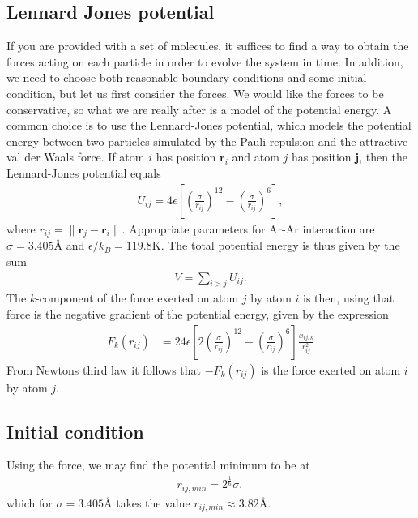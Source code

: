 \documentclass[twoside,utf8]{article}
\newcommand{\EQU}[1] { \begin{equation*} \begin{split} #1 \end{split} \end{equation*} }
\newcommand{\EQUn}[1] { \begin{equation} \begin{split} #1 \end{split} \end{equation} }
\begin{document}
\begin{multicols}{2}
\subsection{Lennard Jones potential}
If you are provided with a set of molecules, it suffices to find a way to obtain the forces acting on each particle in order to evolve the system in time. In addition, we need to choose both reasonable boundary conditions and some initial condition, but let us first consider the forces. We would like the forces to be conservative, so what we are really after is a model of the potential energy. A common choice is to use the Lennard-Jones potential, which models the potential energy between two particles simulated by the Pauli repulsion and the attractive val der Waals force. If atom $i$ has position $\mathbf{r}_i$ and atom $j$ has position $\mathbf{j}$, then the Lennard-Jones potential equals
\EQUn{
U_{ij} = 4 \epsilon \left[ \left(\frac{\sigma}{r_{ij}}\right)^{12} - \left(\frac{\sigma}{r_{ij}}\right)^{6} \right], \label{LennardJonesPotential}
}
where $r_{ij}=\|\mathbf{r}_j-\mathbf{r}_i\|$. Appropriate parameters for Ar-Ar interaction are $\sigma=3.405$\r{A} and $\epsilon/k_B = 119.8$K\cite{LJparametersArAr}. The total potential energy is thus given by the sum
\EQU{
V = \sum_{i>j} U_{ij}.
}
The $k$-component of the force exerted on atom $j$ by atom $i$ is then, using that force is the negative gradient of the potential energy, given by the expression
\EQU{
F_k(r_{ij})&=24 \epsilon \left[ 2\left(\frac{\sigma}{r_{ij}}\right)^{12} - \left(\frac{\sigma}{r_{ij}}\right)^{6} \right]\frac{x_{ij,k}}{r_{ij}^2}
}
From Newtons third law it follows that $-F_k(r_{ij})$ is the force exerted on atom $i$ by atom $j$.


\subsection{Initial condition}
Using the force, we may find the potential minimum to be at
\EQU{
r_{ij,min} = 2^\frac{1}{6} \sigma,
}
which for $\sigma = 3.405$\r{A} takes the value $r_{ij,min}\approx 3.82$\r{A}. 


\end{multicols}
\end{document}
